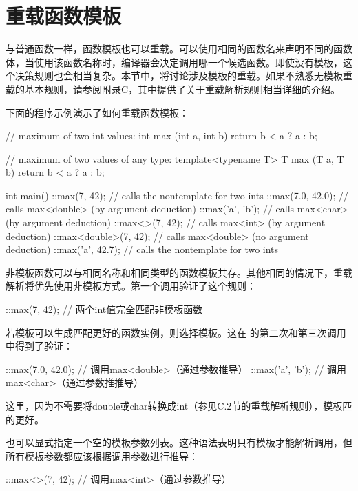 \section{重载函数模板}

与普通函数一样，函数模板也可以重载。可以使用相同的函数名来声明不同的函数体，当使用该函数名称时，编译器会决定调用哪一个候选函数。即使没有模板，这个决策规则也会相当复杂。本节中，将讨论涉及模板的重载。如果不熟悉无模板重载的基本规则，请参阅附录C，其中提供了关于重载解析规则相当详细的介绍。

下面的程序示例演示了如何重载函数模板：

\begin{cpp}
// maximum of two int values:
int max (int a, int b) {
	return b < a ? a : b;
}

// maximum of two values of any type:
template<typename T>
T max (T a, T b) {
	return b < a ? a : b;
}

int main() {
	::max(7, 42); // calls the nontemplate for two ints
	::max(7.0, 42.0); // calls max<double> (by argument deduction)
	::max('a', 'b'); // calls max<char> (by argument deduction)
	::max<>(7, 42); // calls max<int> (by argument deduction)
	::max<double>(7, 42); // calls max<double> (no argument deduction)
	::max('a', 42.7); // calls the nontemplate for two ints
}
\end{cpp}

非模板函数可以与相同名称和相同类型的函数模板共存。其他相同的情况下，重载解析将优先使用非模板方式。第一个调用验证了这个规则：

\begin{cpp}
::max(7, 42); // 两个int值完全匹配非模板函数
\end{cpp}

若模板可以生成匹配更好的函数实例，则选择模板。这在  的第二次和第三次调用中得到了验证：

\begin{cpp}
::max(7.0, 42.0); // 调用max<double>（通过参数推导）
::max('a', 'b'); // 调用max<char>（通过参数推推导）
\end{cpp}

这里，因为不需要将double或char转换成int（参见C.2节的重载解析规则），模板匹的更好。

也可以显式指定一个空的模板参数列表。这种语法表明只有模板才能解析调用，但所有模板参数都应该根据调用参数进行推导：

\begin{cpp}
::max<>(7, 42); // 调用max<int>（通过参数推导）
\end{cpp}

